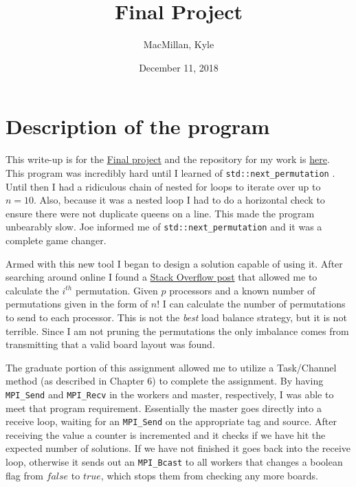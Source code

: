 \documentclass{article}
\title{\textbf{Final Project}}
\author{MacMillan, Kyle}
\date{December 11, 2018}
\begin{document}
\maketitle
{}

\newpage
{}   %
\tableofcontents
{}

\newpage
\listoffigures
{}

\newpage
{}  %
\hypersetup{
    colorlinks,
    citecolor=blue,
    filecolor=black,
    linkcolor=blue,
    urlcolor=blue
}

\section{Description of the program}
\setcounter{page}{1} %
This write-up is for the 
\href{https://www.mcs.sdsmt.edu/ckarlsso/csc410/fall18/csc410_Final.pdf}{Final project} 
and the repository for my work is \href{https://github.com/macattackftw/HighPerfComputing/tree/master/final}{here}.
\\
This program was incredibly hard until I learned of \verb|std::next_permutation|
. Until then I had a ridiculous chain of nested for loops to iterate over up to 
$n = 10$. Also, because it was a nested loop I had to do a horizontal check to 
ensure there were not duplicate queens on a line. This made the program 
unbearably slow. Joe informed me of \verb|std::next_permutation| and it was a 
complete game changer. 

Armed with this new tool I began to design a solution capable of using it. After 
searching around online I found a 
\href{https://stackoverflow.com/a/7919887}{Stack Overflow post} that allowed me 
to calculate the $i^{th}$ permutation. Given $p$ processors and a known number 
of permutations given in the form of $n!$ I can calculate the number of 
permutations to send to each processor. This is not the \textit{best} load 
balance strategy, but it is not terrible. Since I am not pruning the 
permutations the only imbalance comes from transmitting that a valid board 
layout was found.

The graduate portion of this assignment allowed me to utilize a Task/Channel 
method (as described in Chapter 6) to complete the assignment. By having 
\verb|MPI_Send| and \verb|MPI_Recv| in the workers and master, respectively, I 
was able to meet that program requirement. Essentially the master goes directly 
into a receive loop, waiting for an \verb|MPI_Send| on the appropriate tag and 
source. After receiving the value a counter is incremented and it checks if we 
have hit the expected number of solutions. If we have not finished it goes back 
into the receive loop, otherwise it sends out an \verb|MPI_Bcast| to all workers 
that changes a boolean flag from $false$ to $true$, which stops them from 
checking any more boards.
\end{document}
